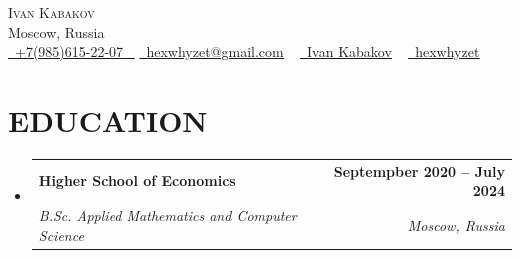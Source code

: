 \documentclass[letterpaper,11pt]{article}
\makeatletter
\newcommand{\resumeSubheading}[4]{
  \vspace{-2pt}\item
    \begin{tabular*}{1.0\textwidth}[t]{l@{\extracolsep{\fill}}r}
      \textbf{\large#1} & \textbf{\small #2} \\
      \textit{\large#3} & \textit{\small #4} \\
      
    \end{tabular*}\vspace{-7pt}
}
\newcommand{\resumeSubHeadingListStart}{\begin{itemize}[leftmargin=0.0in, label={}]}
\newcommand{\resumeSubHeadingListEnd}{\end{itemize}}
\makeatother
\begin{document}


\begin{center}
    {\Huge \scshape Ivan Kabakov} \\ \vspace{1pt}
    Moscow, Russia \\ \vspace{1pt}
    \small \href{tel:+7(985)6152207}{ \raisebox{-0.1\height}\faPhone\ \ul{+7(985)615-22-07} ~} \href{mailto:hexwhyzet@gmail.com}{\raisebox{-0.2\height}\faEnvelope\  \ul{hexwhyzet@gmail.com}} ~ 
    \href{https://linkedin.com/in/ivan-kabakov-a37aa4191/}{\raisebox{-0.2\height}\faLinkedinSquare\ \ul{Ivan Kabakov}}  ~
    \href{https://github.com/hexwhyzet}{\raisebox{-0.2\height}\faGithub\ \ul{hexwhyzet}}
    \vspace{5pt}
\end{center}


\section{EDUCATION}
  \resumeSubHeadingListStart
    \resumeSubheading
      {Higher School of Economics}{Septempber 2020 -- July 2024}
      {B.Sc. Applied Mathematics and Computer Science}{Moscow, Russia}
  \resumeSubHeadingListEnd
  \vspace{-3pt}


\end{document}
